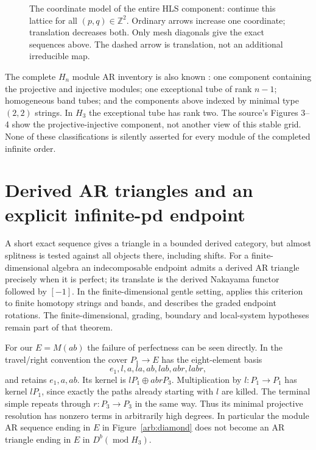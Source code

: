 \documentclass[11pt,oneside,openany]{book}
\theoremstyle{definition}\newtheorem{definition}[theorem]{Definition}
\theoremstyle{remark}\newtheorem{remark}[theorem]{Remark}
\begin{document}
\begin{figure}[htbp]\centering
{}
\caption{The coordinate model of the entire HLS component: continue this
lattice for all $(p,q)\in\mathbb Z^2$. Ordinary arrows increase one coordinate;
translation decreases both. Only mesh diagonals give the exact sequences
above. The dashed arrow is translation, not an additional irreducible map.}
\end{figure}

The complete $H_n$ module AR inventory is also known
\cite[Theorem 3.14]{ARBHLS}: one component containing the projective and injective
modules; one exceptional tube of rank $n-1$; homogeneous band tubes; and the
components above indexed by minimal type $(2,2)$ strings. In $H_3$ the exceptional
tube has rank two. The source's Figures 3--4 show the projective-injective
component, not another view of this stable grid. None of these classifications
is silently asserted for every module of the completed infinite order.

\section[Derived AR triangles]{Derived AR triangles and an explicit infinite-pd endpoint}
A short exact sequence gives a triangle in a bounded derived category, but
almost splitness is tested against all objects there, including shifts.
For a finite-dimensional algebra an indecomposable endpoint admits a derived
AR triangle precisely when it is perfect; its translate is the derived
Nakayama functor followed by $[-1]$. In the finite-dimensional gentle setting,
\cite[Section 5.1]{ARBOPS} applies this criterion to finite homotopy strings and
bands, and describes the graded endpoint rotations. The finite-dimensional,
grading, boundary and local-system hypotheses remain part of that theorem.

For our $E=M(ab)$ the failure of perfectness can be seen directly. In the
travel/right convention the cover $P_1\to E$ has the eight-element basis
\[
 e_1,l,a,la,ab,lab,abr,labr,
\]
and retains $e_1,a,ab$. Its kernel is $lP_1\oplus abrP_3$.
Multiplication by $l:P_1\to P_1$ has kernel $lP_1$, since exactly the paths
already starting with $l$ are killed. The terminal simple repeats through
$r:P_3\to P_3$ in the same way. Thus its minimal projective resolution has
nonzero terms in arbitrarily high degrees. In particular the module AR sequence
ending in $E$ in Figure~\ref{arb:diamond} does not become an AR triangle ending
in $E$ in $D^b(\operatorname{mod}H_3)$.
\end{document}
